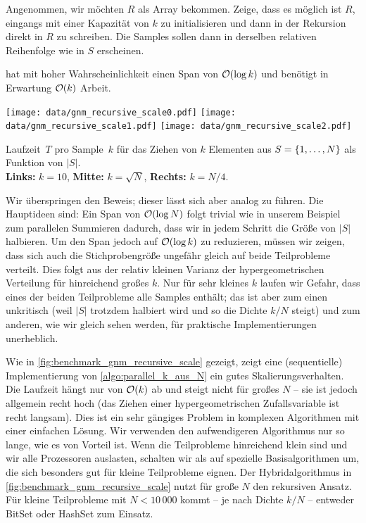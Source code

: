 \begin{exercise}
    Angenommen, wir möchten $R$ als Array bekommen.
    Zeige, dass es möglich ist $R$, eingangs mit einer Kapazität von $k$ zu initialisieren und dann in der Rekursion direkt in $R$ zu schreiben.
    Die Samples sollen dann in derselben relativen Reihenfolge wie in $S$ erscheinen.
\end{exercise}

\begin{lemma}
     hat mit hoher Wahrscheinlichkeit einen Span von $\mathcal{O}\!\left(\log k\right)$ und benötigt in Erwartung $\mathcal{O}\!\left(k\right)$ Arbeit.
\end{lemma}

\begin{widefigure}
    \texttt{[image: data/gnm\_recursive\_scale0.pdf]}\hfill
    \texttt{[image: data/gnm\_recursive\_scale1.pdf]}\hfill
    \texttt{[image: data/gnm\_recursive\_scale2.pdf]}

    \caption{
        Laufzeit~$T$ pro Sample~$k$ für das Ziehen von $k$ Elementen aus $S = \left\{1, \ldots, N\right\}$ als Funktion von $|S|$.\\
        \textbf{Links:} $k=10$, \textbf{Mitte: } $k = \sqrt{N}$, \textbf{Rechts: } $k = N / 4$.
    }
    \label{fig:benchmark_gnm_recursive_scale}
\end{widefigure}

Wir überspringen den Beweis; dieser lässt sich aber analog zu \cite{DBLP:journals/toms/Hubschle-Schneider22} führen.
Die Hauptideen sind: Ein Span von $\mathcal{O}\!\left(\log N\right)$ folgt trivial wie in unserem Beispiel zum parallelen Summieren dadurch, dass wir in jedem Schritt die Größe von $|S|$ halbieren.
Um den Span jedoch auf $\mathcal{O}\!\left(\log k\right)$ zu reduzieren, müssen wir zeigen, dass sich auch die Stichprobengröße ungefähr gleich auf beide Teilprobleme verteilt.
Dies folgt aus der relativ kleinen Varianz der hypergeometrischen Verteilung für hinreichend großes $k$.
Nur für sehr kleines $k$ laufen wir Gefahr, dass eines der beiden Teilprobleme alle Samples enthält;
das ist aber zum einen unkritisch (weil $|S|$ trotzdem halbiert wird und so die Dichte $k/N$ steigt) und zum anderen, wie wir gleich sehen werden, für praktische Implementierungen unerheblich.

Wie in \cref{fig:benchmark_gnm_recursive_scale} gezeigt, zeigt eine (sequentielle) Implementierung von \cref{algo:parallel_k_aus_N} ein gutes Skalierungsverhalten.
Die Laufzeit hängt nur von $\mathcal{O}\!\left(k\right)$ ab und steigt nicht für großes $N$ -- sie ist jedoch allgemein recht hoch (das Ziehen einer hypergeometrischen Zufallsvariable ist recht langsam).
Dies  ist ein sehr gängiges Problem in komplexen Algorithmen mit einer einfachen Lösung.
Wir verwenden den aufwendigeren Algorithmus nur so lange, wie es von Vorteil ist.
Wenn die Teilprobleme hinreichend klein sind und wir alle Prozessoren auslasten, schalten wir als  auf spezielle Basisalgorithmen um, die sich besonders gut für kleine Teilprobleme eignen.
Der Hybridalgorithmus in \cref{fig:benchmark_gnm_recursive_scale} nutzt für große $N$ den rekursiven Ansatz.
Für kleine Teilprobleme mit $N < 10\,000$ kommt  -- je nach Dichte $k/N$ -- entweder BitSet oder HashSet zum Einsatz.

